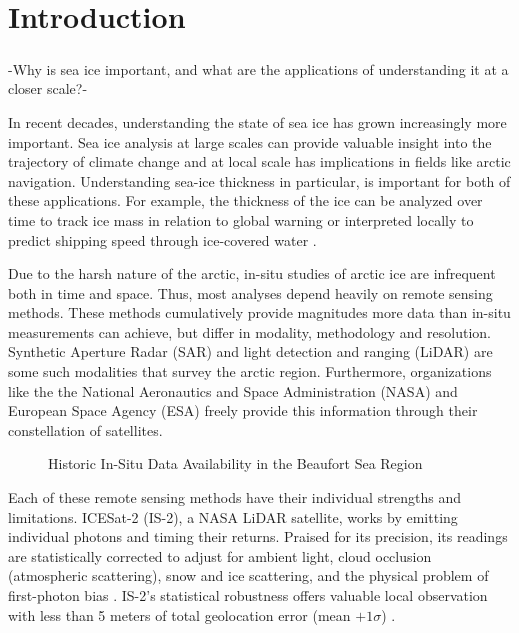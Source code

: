 \chapter{Introduction}
\label{sec:Introduction}

\paragraph{}
-Why is sea ice important, and what are the applications of understanding it at a closer scale?-

\indent In recent decades, understanding the state of sea ice has grown increasingly more important. Sea ice analysis at large scales can provide valuable insight into the trajectory of climate change and at local scale has implications in fields like arctic navigation. Understanding sea-ice thickness in particular, is important for both of these applications.  For example, the thickness of the ice can be analyzed over time to track ice mass in relation to global warning or interpreted locally to predict shipping speed through ice-covered water \cite{sea-ice-properties}.


\indent Due to the harsh nature of the arctic, in-situ studies of arctic ice are infrequent both in time and space. Thus, most analyses depend heavily on remote sensing methods. These methods cumulatively provide magnitudes more data than in-situ measurements can achieve, but differ in modality, methodology and resolution. Synthetic Aperture Radar (SAR) and light detection and ranging (LiDAR) are some such modalities that survey the arctic region. Furthermore, organizations like the the National Aeronautics and Space Administration (NASA) and European Space Agency (ESA) freely provide this information through their constellation of satellites.

\begin{figure}[htb]
	\centering
	\caption{Historic In-Situ Data Availability in the Beaufort Sea Region}
	\label{fig:foobar}
\end{figure}

Each of these remote sensing methods have their individual strengths and limitations. ICESat-2 (IS-2), a NASA LiDAR satellite, works by emitting individual photons and timing their returns.
Praised for its precision, its readings are statistically corrected to adjust for ambient light, cloud occlusion (atmospheric scattering), snow and ice scattering, and the physical problem of first-photon bias \cite{ICESat-2-ATL10-Product}.
IS-2's statistical robustness offers valuable local observation with less than 5 meters of total geolocation error (mean \(+ 1\sigma\)) \cite{ICESat-2-Horizontal-Accuracy}.

